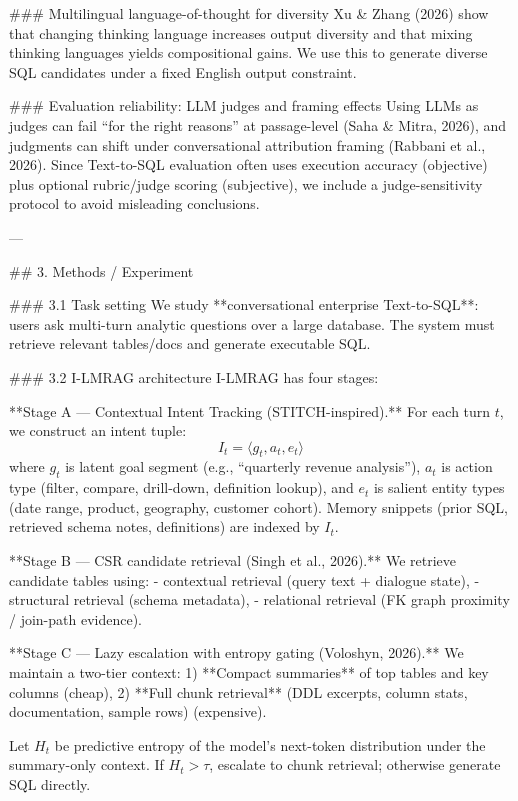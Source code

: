 ### Multilingual language-of-thought for diversity  
Xu & Zhang (2026) show that changing thinking language increases output diversity and that mixing thinking languages yields compositional gains. We use this to generate diverse SQL candidates under a fixed English output constraint.

### Evaluation reliability: LLM judges and framing effects  
Using LLMs as judges can fail “for the right reasons” at passage-level (Saha & Mitra, 2026), and judgments can shift under conversational attribution framing (Rabbani et al., 2026). Since Text-to-SQL evaluation often uses execution accuracy (objective) plus optional rubric/judge scoring (subjective), we include a judge-sensitivity protocol to avoid misleading conclusions.

---

## 3. Methods / Experiment  

### 3.1 Task setting  
We study **conversational enterprise Text-to-SQL**: users ask multi-turn analytic questions over a large database. The system must retrieve relevant tables/docs and generate executable SQL.

### 3.2 I-LMRAG architecture  
I-LMRAG has four stages:

**Stage A — Contextual Intent Tracking (STITCH-inspired).**  
For each turn \(t\), we construct an intent tuple:  
\[
I_t = \langle g_t, a_t, e_t \rangle
\]
where \(g_t\) is latent goal segment (e.g., “quarterly revenue analysis”), \(a_t\) is action type (filter, compare, drill-down, definition lookup), and \(e_t\) is salient entity types (date range, product, geography, customer cohort). Memory snippets (prior SQL, retrieved schema notes, definitions) are indexed by \(I_t\).

**Stage B — CSR candidate retrieval (Singh et al., 2026).**  
We retrieve candidate tables using:  
- contextual retrieval (query text + dialogue state),  
- structural retrieval (schema metadata),  
- relational retrieval (FK graph proximity / join-path evidence).

**Stage C — Lazy escalation with entropy gating (Voloshyn, 2026).**  
We maintain a two-tier context:  
1) **Compact summaries** of top tables and key columns (cheap),  
2) **Full chunk retrieval** (DDL excerpts, column stats, documentation, sample rows) (expensive).  

Let \(H_t\) be predictive entropy of the model’s next-token distribution under the summary-only context. If \(H_t > \tau\), escalate to chunk retrieval; otherwise generate SQL directly.

